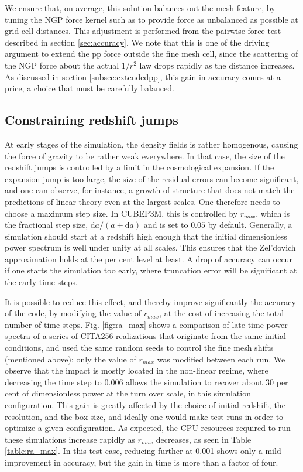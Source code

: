 We ensure that, on average, this solution balances out the mesh feature,
by tuning the NGP force kernel such as to provide  force as unbalanced as possible at grid cell distances.
This adjustment is performed from the pairwise force test described in section \ref{sec:accuracy}.
We note that this is one of the driving argument to extend the pp force outside the fine mesh cell,
since the scattering of the NGP force about the actual $1/r^{2}$ law drops rapidly as the distance increases.
As discussed in section \ref{subsec:extendedpp}, this gain in accuracy comes at a price,
a choice that  must be carefully balanced.

\subsection{Constraining redshift jumps}

At early stages of the simulation, the density fields is rather homogenous, causing the force of gravity to be
rather weak everywhere. In that case, the size of the redshift jumps is controlled by a limit in the cosmological expansion.
If the expansion jump is too large, the size of the residual errors can become significant, and one can observe, for instance,
a growth of structure that does not match the predictions of  linear theory even at the largest scales.
One therefore needs to choose a maximum step size. In {\small CUBEP3M}, this is controlled by $r_{max}$, which is the fractional step size,
$\mbox{d}a/(a + \mbox{d}a)$ and is set to $0.05$ by default.  Generally, a simulation should start at a redshift high enough that
the initial dimensionless power spectrum is well under unity at all scales. This ensures that the Zel'dovich approximation
 holds at the per cent level at least. A drop of accuracy can occur if one starts the simulation too early, where
 truncation error will be significant at the early time steps.


It is possible to reduce this effect, and thereby improve significantly 
the accuracy of the code, by modifying the value of $r_{max}$, at the cost of increasing the total number of time steps.
Fig. \ref{fig:ra_max} shows a comparison of late time power spectra of a series of CITA256 realizations that originate from the same initial conditions, 
and used the same random seeds to control the fine mesh shifts (mentioned above): only the value of $r_{max}$ was modified between each run. 
We observe that the impact is mostly located in the non-linear regime, where decreasing the time step to 0.006 
allows the simulation to recover about 30 per cent of dimensionless power at the turn over scale, in this simulation configuration.
This gain is greatly affected by the choice of initial redshift, the resolution, and the box size, and ideally one would make
test runs in order to optimize a given configuration.  
As expected, the {\small CPU} resources required to run these simulations increase rapidly as $r_{max}$ decreases, as seen in Table \ref{table:ra_max}. 
In this test case, reducing further at 0.001 shows only a mild improvement in accuracy, but the gain in time is more than a factor of four.


